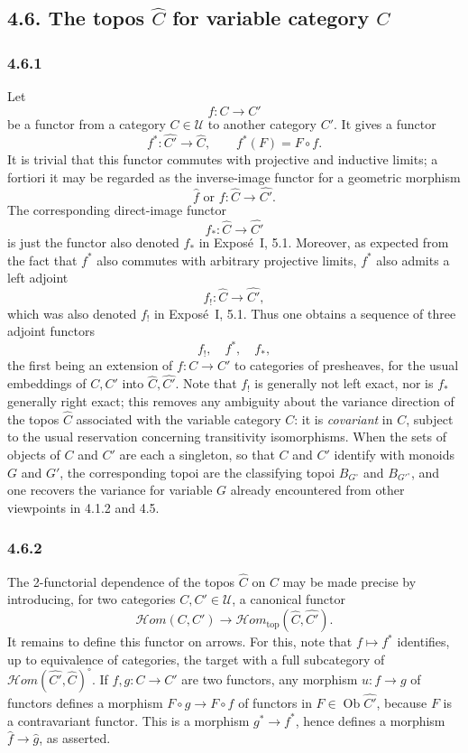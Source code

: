 \documentclass[11pt]{article}
\newcommand{\U}{\mathcal{U}}
\newcommand{\Ob}{\operatorname{Ob}}
\newcommand{\Hhom}{\mathcal{H}om}
\newcommand{\Hhomtop}{\mathcal{H}om_{\mathrm{top}}}
\providecommand{\Ob}{\operatorname{Ob}}
\begin{document}
\subsection*{4.6. The topos \(\widehat C\) for variable category \(C\)}

\subsubsection*{4.6.1}
Let
\[
f:C\longrightarrow C'
\]
be a functor from a category \(C\in\U\) to another category \(C'\). It gives a functor
\[
f^\ast:\widehat{C'}\longrightarrow\widehat C,
\qquad
f^\ast(F)=F\circ f.
\]
It is trivial that this functor commutes with projective and inductive limits; a fortiori it may be regarded as the inverse-image functor for a geometric morphism
\[
\widehat f\text{ or }f:\widehat C\longrightarrow\widehat{C'}.
\]
The corresponding direct-image functor
\[
f_\ast:\widehat C\longrightarrow\widehat{C'}
\]
is just the functor also denoted \(f_\ast\) in Expos\'e~I, 5.1. Moreover, as expected from the fact that \(f^\ast\) also commutes with arbitrary projective limits, \(f^\ast\) also admits a left adjoint
\[
f_!:\widehat C\longrightarrow\widehat{C'},
\]
which was also denoted \(f_!\) in Expos\'e~I, 5.1. Thus one obtains a sequence of three adjoint functors
\[
f_!,\quad f^\ast,\quad f_\ast,
\]
the first being an extension of \(f:C\to C'\) to categories of presheaves, for the usual embeddings of \(C,C'\) into \(\widehat C,\widehat{C'}\). Note that \(f_!\) is generally not left exact, nor is \(f_\ast\) generally right exact; this removes any ambiguity about the variance direction of the topos \(\widehat C\) associated with the variable category \(C\): it is \emph{covariant} in \(C\), subject to the usual reservation concerning transitivity isomorphisms. When the sets of objects of \(C\) and \(C'\) are each a singleton, so that \(C\) and \(C'\) identify with monoids \(G\) and \(G'\), the corresponding topoi are the classifying topoi \(B_{G^\circ}\) and \(B_{{G'}^\circ}\), and one recovers the variance for variable \(G\) already encountered from other viewpoints in 4.1.2 and 4.5.

\subsubsection*{4.6.2}
The 2-functorial dependence of the topos \(\widehat C\) on \(C\) may be made precise by introducing, for two categories \(C,C'\in\U\), a canonical functor
\[
\Hhom(C,C')\longrightarrow\Hhomtop(\widehat C,\widehat{C'}).\tag{4.6.2.1}
\]
It remains to define this functor on arrows. For this, note that \(f\mapsto f^\ast\) identifies, up to equivalence of categories, the target with a full subcategory of \(\Hhom(\widehat{C'},\widehat C)^\circ\). If \(f,g:C\to C'\) are two functors, any morphism \(u:f\to g\) of functors defines a morphism \(F\circ g\to F\circ f\) of functors in \(F\in\Ob\widehat{C'}\), because \(F\) is a contravariant functor. This is a morphism \(g^\ast\to f^\ast\), hence defines a morphism \(\widehat f\to\widehat g\), as asserted.
\end{document}

